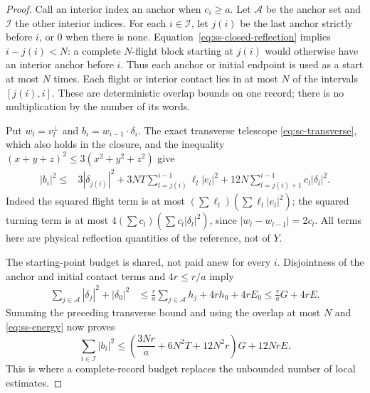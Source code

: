 \begin{proof}
Call an interior index an anchor when $c_i\ge a$. Let $\mathcal A$
be the anchor set and $\mathcal I$ the other interior indices. For each
$i\in\mathcal I$, let $j(i)$ be the last anchor strictly before $i$,
or $0$ when there is none. Equation~\eqref{eq:ss-closed-reflection}
implies $i-j(i)<N$: a complete $N$-flight block starting at $j(i)$
would otherwise have an interior anchor before $i$. Thus each anchor
or initial endpoint is used as a start at most $N$ times. Each flight
or interior contact lies in at most $N$ of the intervals
$[j(i),i]$. These are deterministic overlap bounds on one record;
there is no multiplication by the number of its words.

Put $w_l=v_l^\perp$ and $b_i=w_{i-1}\cdot\delta_i$.
The exact transverse telescope \eqref{eq:sc-transverse}, which also
holds in the closure, and the inequality
$(x+y+z)^2\le3(x^2+y^2+z^2)$ give
\begin{align*}
 |b_i|^2\le{}&3|\delta_{j(i)}|^2
  +3NT\sum_{l=j(i)}^{i-1}\ell_l|e_l|^2
  +12N\sum_{l=j(i)+1}^{i-1}c_l|\delta_l|^2.
\end{align*}
Indeed the squared flight term is at most
$(\sum\ell_l)(\sum\ell_l|e_l|^2)$; the squared turning term is at
most $4(\sum c_l)(\sum c_l|\delta_l|^2)$, since
$|w_l-w_{l-1}|=2c_l$. All terms here are physical reflection
quantities of the reference, not of $Y$.

The starting-point budget is shared, not paid anew for every $i$.
Disjointness of the anchor and initial contact terms and $4r\le r/a$
imply
\begin{align*}
 \sum_{j\in\mathcal A}|\delta_j|^2+|\delta_0|^2
 &\le \frac r a\sum_{j\in\mathcal A}h_j+4r h_0+4r E_0
 \le \frac r a G+4r E.
\end{align*}
Summing the preceding transverse bound and using the overlap at most
$N$ and \eqref{eq:ss-energy} now proves
\begin{equation}\label{eq:ss-transverse-sum}
 \sum_{i\in\mathcal I}|b_i|^2
 \le\left(\frac{3Nr}{a}+6N^2T+12N^2r\right)G+12Nr E.
\end{equation}
This is where a complete-record budget replaces the unbounded number
of local estimates.


\end{proof}
